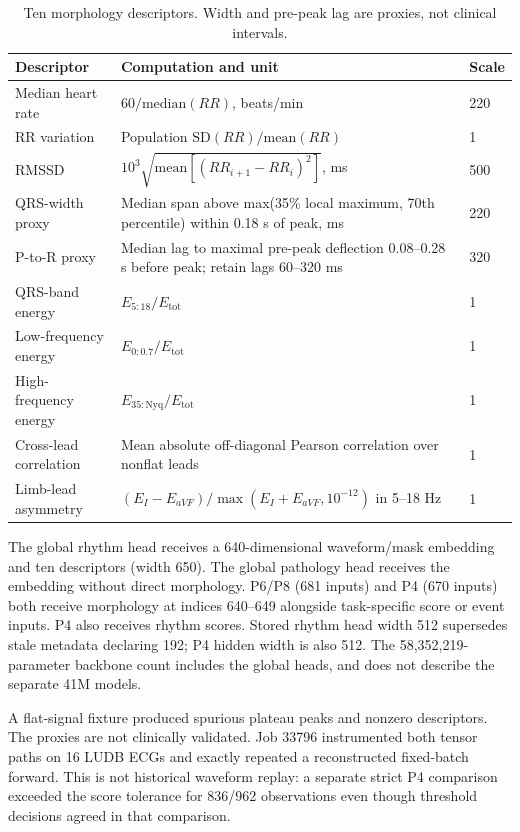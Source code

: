 \begin{table}[htbp]
\caption{Ten morphology descriptors. Width and pre-peak lag are proxies, not clinical intervals.\label{tab:morphology}}
\centering\small
\begin{tabular}{@{}p{.25\linewidth}p{.57\linewidth}p{.12\linewidth}@{}}
\toprule
Descriptor & Computation and unit & Scale \\
\midrule
Median heart rate & $60/\mathrm{median}(RR)$, beats/min & 220 \\
RR variation & Population $\mathrm{SD}(RR)/\mathrm{mean}(RR)$ & 1 \\
RMSSD & $10^3\sqrt{\mathrm{mean}[(RR_{i+1}-RR_i)^2]}$, ms & 500 \\
QRS-width proxy & Median span above max(35\% local maximum, 70th percentile) within 0.18 s of peak, ms & 220 \\
P-to-R proxy & Median lag to maximal pre-peak deflection 0.08--0.28 s before peak; retain lags 60--320 ms & 320 \\
QRS-band energy & $E_{5:18}/E_{\mathrm{tot}}$ & 1 \\
Low-frequency energy & $E_{0:0.7}/E_{\mathrm{tot}}$ & 1 \\
High-frequency energy & $E_{35:\mathrm{Nyq}}/E_{\mathrm{tot}}$ & 1 \\
Cross-lead correlation & Mean absolute off-diagonal Pearson correlation over nonflat leads & 1 \\
Limb-lead asymmetry & $(E_I-E_{aVF})/\max(E_I+E_{aVF},10^{-12})$ in 5--18 Hz & 1 \\
\bottomrule
\end{tabular}
\end{table}

The global rhythm head receives a 640-dimensional waveform/mask embedding and ten descriptors (width 650). The global pathology head receives the embedding without direct morphology. P6/P8 (681 inputs) and P4 (670 inputs) both receive morphology at indices 640--649 alongside task-specific score or event inputs. P4 also receives rhythm scores. Stored rhythm head width 512 supersedes stale metadata declaring 192; P4 hidden width is also 512. The 58,352,219-parameter backbone count includes the global heads, and does not describe the separate 41M models.

A flat-signal fixture produced spurious plateau peaks and nonzero descriptors. The proxies are not clinically validated. Job 33796 instrumented both tensor paths on 16 LUDB ECGs and exactly repeated a reconstructed fixed-batch forward. This is not historical waveform replay: a separate strict P4 comparison exceeded the score tolerance for 836/962 observations even though threshold decisions agreed in that comparison.

